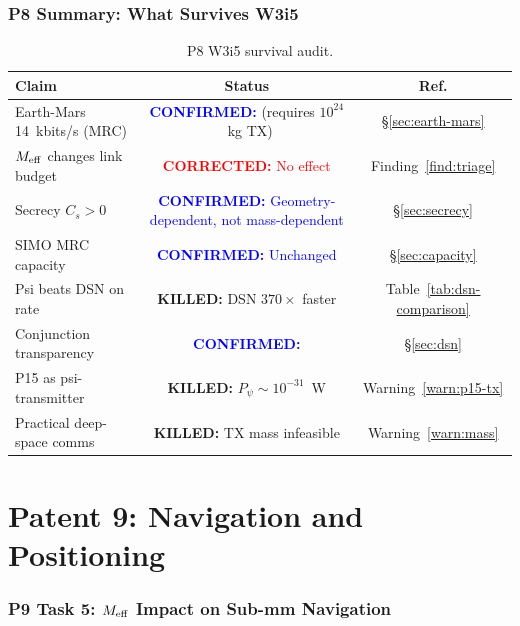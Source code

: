 \documentclass[aps,prd,twocolumn,superscriptaddress,nofootinbib]{revtex4-2}
\newcommand{\confirmed}[1]{\textcolor{blue}{\textbf{CONFIRMED:} #1}}
\newcommand{\corrected}[1]{\textcolor{red}{\textbf{CORRECTED:} #1}}
\newcommand{\killed}[1]{\textcolor{red!70!black}{\textbf{KILLED:} #1}}
\begin{document}
\section{P8 Summary: What Survives W3i5}
\label{sec:p8-summary}

\begin{table}[h]
\centering
\caption{P8 W3i5 survival audit.}
\begin{tabular}{p{4.5cm}cc}
\hline\hline
Claim & Status & Ref. \\
\hline
Earth-Mars 14~kbits/s (MRC) & \confirmed{} (requires $10^{24}$~kg TX) & \S\ref{sec:earth-mars} \\
$M_{\rm eff}$ changes link budget & \corrected{No effect} & Finding~\ref{find:triage} \\
Secrecy $C_s > 0$ & \confirmed{Geometry-dependent, not mass-dependent} & \S\ref{sec:secrecy} \\
SIMO MRC capacity & \confirmed{Unchanged} & \S\ref{sec:capacity} \\
Psi beats DSN on rate & \killed{DSN $370\times$ faster} & Table~\ref{tab:dsn-comparison} \\
Conjunction transparency & \confirmed{} & \S\ref{sec:dsn} \\
P15 as psi-transmitter & \killed{$P_\psi \sim 10^{-31}$~W} & Warning~\ref{warn:p15-tx} \\
Practical deep-space comms & \killed{TX mass infeasible} & Warning~\ref{warn:mass} \\
\hline\hline
\end{tabular}
\label{tab:p8-summary}
\end{table}

\part*{Patent 9: Navigation and Positioning}

\section{P9 Task 5: $M_{\rm eff}$ Impact on Sub-mm Navigation}
\label{sec:p9-meff}
\end{document}

